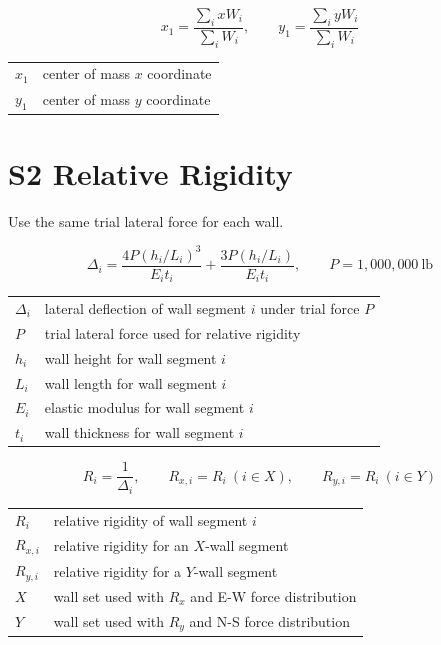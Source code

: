 \documentclass[10pt]{article}
\begin{document}
\begin{equation}
x_1 = \frac{\sum_i xW_i}{\sum_i W_i}, \qquad
y_1 = \frac{\sum_i yW_i}{\sum_i W_i}
\end{equation}

{\ttfamily\footnotesize
\begin{tabular}{@{}ll@{}}
$x_1$ & center of mass $x$ coordinate \\
$y_1$ & center of mass $y$ coordinate \\
\end{tabular}
}

\section{S2 Relative Rigidity}

Use the same trial lateral force for each wall.

\begin{equation}
\Delta_i =
\frac{4P(h_i/L_i)^3}{E_i t_i}
+ \frac{3P(h_i/L_i)}{E_i t_i},
\qquad
P = 1{,}000{,}000\ \text{lb}
\end{equation}

{\ttfamily\footnotesize
\begin{tabular}{@{}ll@{}}
$\Delta_i$ & lateral deflection of wall segment $i$ under trial force $P$ \\
$P$ & trial lateral force used for relative rigidity \\
$h_i$ & wall height for wall segment $i$ \\
$L_i$ & wall length for wall segment $i$ \\
$E_i$ & elastic modulus for wall segment $i$ \\
$t_i$ & wall thickness for wall segment $i$ \\
\end{tabular}
}

\begin{equation}
R_i = \frac{1}{\Delta_i}, \qquad
R_{x,i}=R_i\ (i\in X), \qquad
R_{y,i}=R_i\ (i\in Y)
\end{equation}

{\ttfamily\footnotesize
\begin{tabular}{@{}ll@{}}
$R_i$ & relative rigidity of wall segment $i$ \\
$R_{x,i}$ & relative rigidity for an $X$-wall segment \\
$R_{y,i}$ & relative rigidity for a $Y$-wall segment \\
$X$ & wall set used with $R_x$ and E-W force distribution \\
$Y$ & wall set used with $R_y$ and N-S force distribution \\
\end{tabular}
}
\end{document}

